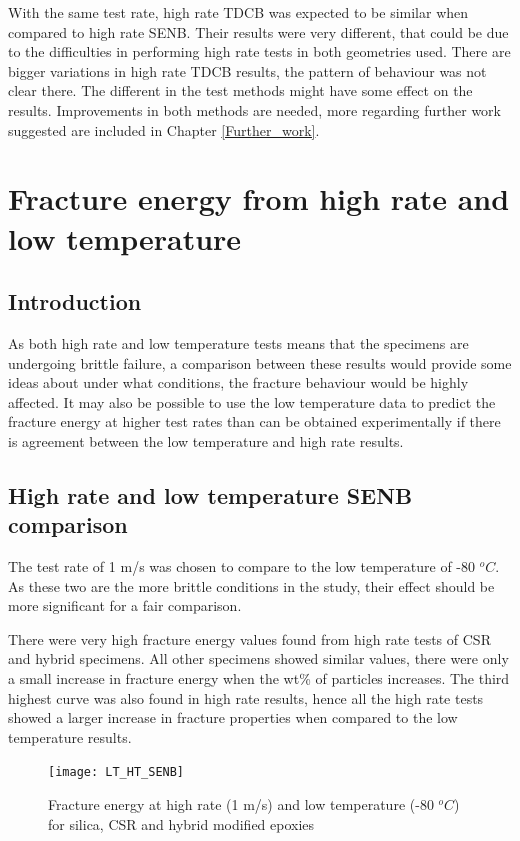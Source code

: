\documentclass[numbers=noendperiod,chapterprefix=on]{icldt} %
\begin{document}
With the same test rate, high rate TDCB was expected to be similar when compared to high rate SENB. Their results were very different, that could be due to the difficulties in performing high rate tests in both geometries used. There are bigger variations in high rate TDCB results, the pattern of behaviour was not clear there. The different in the test methods might have some effect on the results.
Improvements in both methods are needed, more regarding further work suggested are included in Chapter \ref{Further_work}. 

\section{Fracture energy from high rate and low temperature}

\subsection{Introduction}
As both high rate and low temperature tests means that the specimens are undergoing brittle failure, a comparison between these results would provide some ideas about under what conditions, the fracture behaviour would be highly affected. 
It may also be possible to use the low temperature data to predict the fracture energy at higher test rates than can be obtained experimentally if there is agreement between the low temperature and high rate results.

\subsection{High rate and low temperature SENB comparison}
The test rate of 1 m/s was chosen to compare to the low temperature of -80 $^oC$. As these two are the more brittle conditions in the study, their effect should be more significant for a fair comparison.

There were very high fracture energy values found from high rate tests of CSR and hybrid specimens. All other specimens showed similar values, there were only a small increase in fracture energy when the wt\% of particles increases. The third highest curve was also found in high rate results, hence all the high rate tests showed a larger increase in fracture properties when compared to the low temperature results.
 
\begin{figure}[!htpb]
\centering
\texttt{[image: LT\_HT\_SENB]}
\caption{Fracture energy at high rate (1 m/s) and low temperature (-80 $^oC$) for silica, CSR and hybrid modified epoxies} \label{LT_HT_SENB}
\end{figure} 
\FloatBarrier
\end{document}
